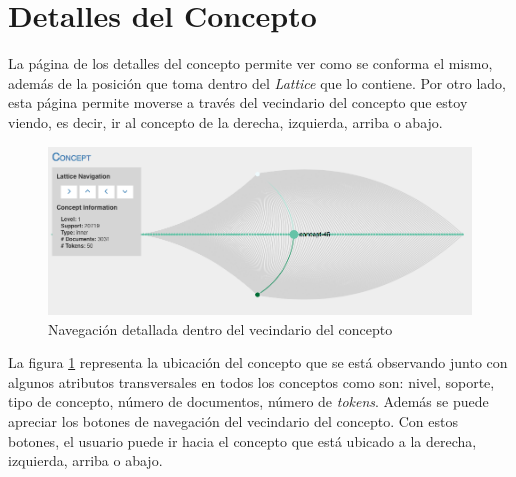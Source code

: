 \documentclass[12pt,oneside,letterpaper]{book}
\newcommand{\eng}[1]{\textit{#1}\xspace}			%
\theoremstyle{definition}
\begin{document}
\section{Detalles del Concepto}
La página de los detalles del concepto permite ver como se conforma el mismo, además de la posición que toma dentro del \eng{Lattice} que lo contiene. Por otro lado, esta página permite moverse a través del vecindario del concepto que estoy viendo, es decir, ir al concepto de la derecha, izquierda, arriba o abajo.

\begin{figure}[h!]
	\centering
	\includegraphics[width=1\textwidth]{images/results_6.png}
	\caption{Navegación detallada dentro del vecindario del concepto}
	\label{fig:results_6}
\end{figure}

La figura \ref{fig:results_6} representa la ubicación del concepto que se está observando junto con algunos atributos transversales en todos los conceptos como son: nivel, soporte, tipo de concepto, número de documentos, número de \eng{tokens}. Además se puede apreciar los botones de navegación del vecindario del concepto. Con estos botones, el usuario puede ir hacia el concepto que está ubicado a la derecha, izquierda, arriba o abajo.
\end{document}
